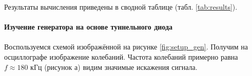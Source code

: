 \documentclass[a4paper,12pt]{article}
\begin{document}
\noindent Результаты вычисления приведены в сводной таблице (табл. \ref{tab:results}). 
	
\paragraph{Изучение генератора на основе туннельного диода}

\paragraph{}
	Воспользуемся схемой изображённой на рисунке \ref{fig:setup_gen}. Получим на осциллографе изображение колебаний. Частота колебаний примерно равна $f \approx 180$ кГц (рисунок а) видим значимые искажения сигнала.

\begin{figure}[h]
\begin{minipage}[h]{0.49\linewidth}
\end{minipage}
\hfill
\begin{minipage}[h]{0.49\linewidth}

\end{minipage}
\end{figure}
\end{document}
